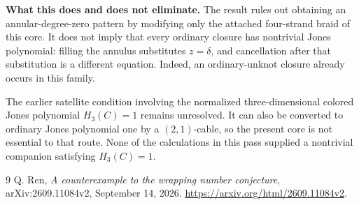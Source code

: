 \documentclass[11pt]{article}
\begin{document}
\medskip
\noindent\textbf{What this does and does not eliminate.}
The result rules out obtaining an annular-degree-zero pattern by modifying only the attached four-strand braid of this core. It does not imply that every ordinary closure has nontrivial Jones polynomial: filling the annulus substitutes $z=\delta$, and cancellation after that substitution is a different equation. Indeed, an ordinary-unknot closure already occurs in this family.

The earlier satellite condition involving the normalized three-dimensional colored Jones polynomial $H_3(C)=1$ remains unresolved. It can also be converted to ordinary Jones polynomial one by a $(2,1)$-cable, so the present core is not essential to that route. None of the calculations in this pass supplied a nontrivial companion satisfying $H_3(C)=1$.

\begin{thebibliography}{9}
 Q. Ren, \emph{A counterexample to the wrapping number conjecture},
arXiv:2609.11084v2, September 14, 2026.
\url{https://arxiv.org/html/2609.11084v2}.
\end{thebibliography}
\end{document}
